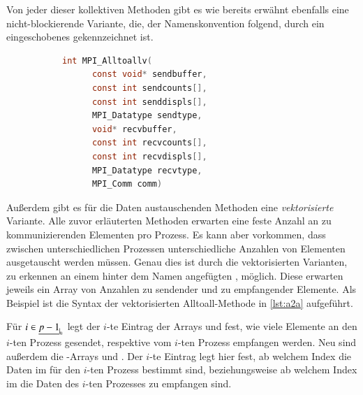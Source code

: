       Von jeder dieser kollektiven Methoden gibt es wie bereits erwähnt ebenfalls eine nicht-blockierende Variante, die, der Namenskonvention folgend, durch ein eingeschobenes 
      gekennzeichnet ist. 
      
      \begin{figure}[b]
      \begin{subfigure}{0.9\textwidth}
      \begin{lstlisting}[language=C, label=lst:a2a, caption={Die Syntax von \code{MPI\_Alltoallv}}, numbers=none]
	int MPI_Alltoallv(
	  const void* sendbuffer,
	  const int sendcounts[], 
	  const int senddispls[], 
	  MPI_Datatype sendtype, 
	  void* recvbuffer, 
	  const int recvcounts[], 
	  const int recvdispls[], 
	  MPI_Datatype recvtype, 
	  MPI_Comm comm)
      \end{lstlisting}
      \end{subfigure}
      \end{figure}
      
      Außerdem gibt es für die Daten austauschenden Methoden eine \textit{vektorisierte} Variante. Alle zuvor erläuterten Methoden erwarten eine feste Anzahl an zu 
      kommunizierenden Elementen pro Prozess.
      Es kann aber vorkommen, dass zwischen unterschiedlichen Prozessen unterschiedliche Anzahlen von Elementen ausgetauscht werden müssen. Genau dies ist durch die vektorisierten Varianten, 
      zu erkennen an einem hinter dem Namen angefügten , möglich. Diese erwarten jeweils ein Array von Anzahlen zu sendender und zu empfangender Elemente.
      Als Beispiel ist die Syntax der vektorisierten Alltoall-Methode in \autoref{lst:a2a} aufgeführt.
      
      Für $i \in \nullhaken{p-1}$ legt der $i$-te Eintrag der Arrays  und  fest, wie viele Elemente an den $i$-ten Prozess gesendet, respektive vom $i$-ten
      Prozess empfangen werden. Neu sind außerdem die -Arrays  und . Der $i$-te Eintrag legt hier fest, ab welchem Index die Daten im 
       für den $i$-ten Prozess bestimmt sind, beziehungsweise ab welchem Index im  die Daten des $i$-ten Prozesses zu empfangen sind. \citep{mpiv31}


      \clearpage
      
      